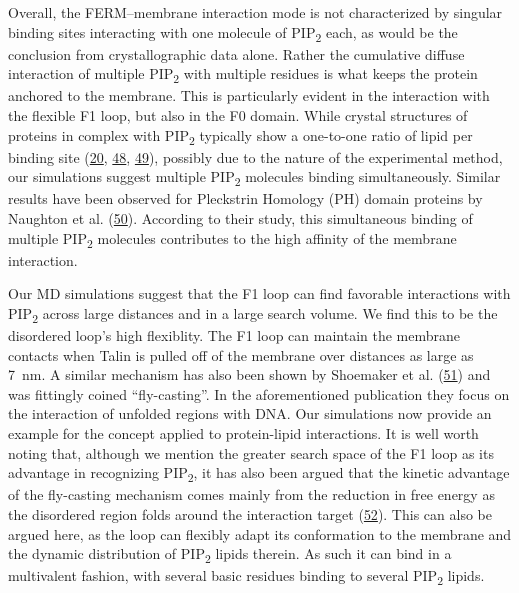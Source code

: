 \documentclass[
  twocolumn]{biophys-new-mod}
\begin{document}
Overall, the FERM--membrane interaction mode is not characterized by
singular binding sites interacting with one molecule of
PIP\textsubscript{2} each, as would be the conclusion from
crystallographic data alone. Rather the cumulative diffuse interaction
of multiple PIP\textsubscript{2} with multiple residues is what keeps
the protein anchored to the membrane. This is particularly evident in
the interaction with the flexible F1 loop, but also in the F0 domain.
While crystal structures of proteins in complex with
PIP\textsubscript{2} typically show a one-to-one ratio of lipid per
binding site
(\protect\hyperlink{ref-chinthalapudiInteractionTalinCell2018a}{20},
\protect\hyperlink{ref-chinthalapudiLipidBindingPromotes2018}{48},
\protect\hyperlink{ref-jianMolecularBasisCooperative2015}{49}), possibly
due to the nature of the experimental method, our simulations suggest
multiple PIP\textsubscript{2} molecules binding simultaneously. Similar
results have been observed for Pleckstrin Homology (PH) domain proteins
by Naughton et al.
(\protect\hyperlink{ref-naughtonModesInteractionPleckstrin2018}{50}).
According to their study, this simultaneous binding of multiple
PIP\textsubscript{2} molecules contributes to the high affinity of the
membrane interaction.

Our MD simulations suggest that the F1 loop can find favorable
interactions with PIP\textsubscript{2} across large distances and in a
large search volume. We find this to be the disordered loop's high
flexiblity. The F1 loop can maintain the membrane contacts when Talin is
pulled off of the membrane over distances as large as 7~nm. A similar
mechanism has also been shown by Shoemaker et al.
(\protect\hyperlink{ref-shoemakerSpeedingMolecularRecognition2000}{51})
and was fittingly coined ``fly-casting''. In the aforementioned
publication they focus on the interaction of unfolded regions with DNA.
Our simulations now provide an example for the concept applied to
protein-lipid interactions. It is well worth noting that, although we
mention the greater search space of the F1 loop as its advantage in
recognizing PIP\textsubscript{2}, it has also been argued that the
kinetic advantage of the fly-casting mechanism comes mainly from the
reduction in free energy as the disordered region folds around the
interaction target
(\protect\hyperlink{ref-huangKineticAdvantageIntrinsically2009}{52}).
This can also be argued here, as the loop can flexibly adapt its
conformation to the membrane and the dynamic distribution of
PIP\textsubscript{2} lipids therein. As such it can bind in a
multivalent fashion, with several basic residues binding to several
PIP\textsubscript{2} lipids.
\end{document}
